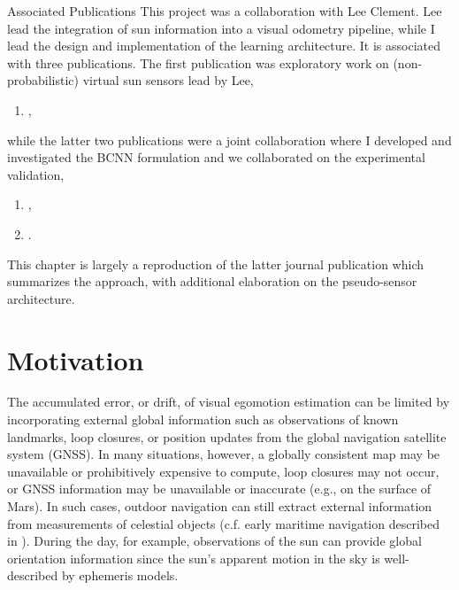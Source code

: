 \begin{remark}{Associated Publications}
This project was a collaboration with Lee Clement. Lee lead the integration of sun information into a visual odometry pipeline, while I lead the design and implementation of the learning architecture. It is associated with three publications. The first publication was exploratory work on (non-probabilistic) virtual sun sensors lead by Lee,
\begin{enumerate}
\item {},
\end{enumerate}
while the latter two publications were a joint collaboration where I developed and investigated the BCNN formulation and we collaborated on the experimental validation,
\begin{enumerate}[resume]
\item {},
\item {}.
\end{enumerate}
This chapter is largely a reproduction of the latter journal publication which summarizes the approach, with additional elaboration on the pseudo-sensor architecture.
\end{remark} 

\section{Motivation}


The accumulated error, or drift, of visual egomotion estimation can be limited by incorporating external global information such as observations of known landmarks, loop closures, or position updates from the global navigation satellite system (GNSS).
In many situations, however, a globally consistent map may be unavailable or prohibitively expensive to compute, loop closures may not occur, or GNSS information may be unavailable or inaccurate (e.g., on the surface of Mars).
In such cases, outdoor navigation can still extract external information from measurements of celestial objects (c.f. early maritime navigation described in ). During the day, for example, observations of the sun can provide global orientation information since the sun's apparent motion in the sky is well-described by ephemeris models.


